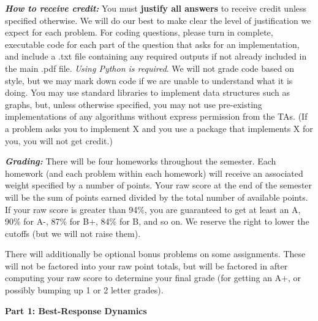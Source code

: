 \documentclass[11pt,letterpaper]{article}
\theoremstyle{definition}
\begin{document}
\begin{footnotesize}
\emph{\textbf{How to receive credit:}}
You must \textbf{justify all answers} to receive credit unless specified otherwise. We will do our best to make clear the level of justification we expect for each problem.
For coding questions, please turn in complete, executable code for each part of the question that asks 
for an implementation, and include a .txt file containing any required outputs if not already included in 
the main .pdf file. 
\emph{Using Python is required}. We will not grade code based on style, but we may mark down code if we are 
unable to understand what it is doing. You may use standard libraries to implement data structures 
such as graphs, but, unless otherwise specified, you may not use pre-existing implementations of any 
algorithms without express permission from the TAs. (If a problem asks you to implement X and you use a package that implements X for you, you will not get credit.)

\emph{\textbf{Grading:}} There will be four homeworks throughout the semester. Each homework (and each problem within each homework) will receive an associated weight specified by a number of points. Your raw score at the end of the semester will be the sum of points earned divided by the total number of available points. 
If your raw score is greater than 94\%, you are guaranteed to get at least an A, 90\% for A-, 87\% for B+, 84\% for B, and so on.
We reserve the right to lower the cutoffs (but we will not raise them).

There will additionally be optional bonus problems on some assignments. These will not be factored into your raw point totals, but will be factored in after computing your raw score to determine your final grade (for getting an A+, or possibly bumping up 1 or 2 letter grades).

\end{footnotesize}
\fi

\newpage

\noindent
{\Large\textbf{Part 1: Best-Response Dynamics}\par}
\end{document}
